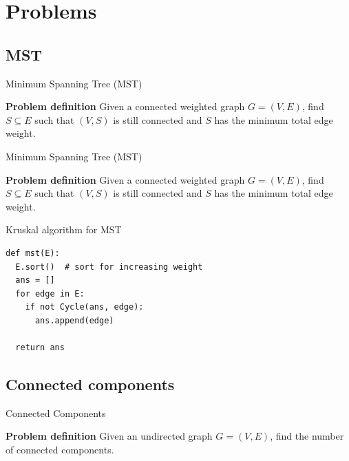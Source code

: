 \documentclass[compress]{beamer}
\begin{document}
\section{Problems}

\subsection{MST}
\begin{frame}{Minimum Spanning Tree (MST)}
  \begin{block}{\textbf{Problem definition}}
    Given a connected weighted graph $G = (V, E)$, find $S \subseteq E$ such that $(V, S)$ is still connected and $S$ has the minimum total edge weight.
  \end{block}
  \begin{center}
  
  \end{center}
\end{frame}

\begin{frame}{Minimum Spanning Tree (MST)}
  \begin{block}{\textbf{Problem definition}}
    Given a connected weighted graph $G = (V, E)$, find $S \subseteq E$ such that $(V, S)$ is still connected and $S$ has the minimum total edge weight.
  \end{block}
  \begin{center}
  
  \end{center}
\end{frame}

\begin{frame}[fragile]{Kruskal algorithm for MST}
\begin{lstlisting}
def mst(E):
  E.sort()  # sort for increasing weight
  ans = []
  for edge in E:
    if not Cycle(ans, edge):
      ans.append(edge)

  return ans
\end{lstlisting}
\end{frame}

\subsection{Connected components}
\begin{frame}{Connected Components}
  \begin{block}{\textbf{Problem definition}}
    Given an undirected graph $G = (V, E)$, find the number of connected components.
  \end{block}
  \begin{center}
  
  \end{center}
\end{frame}
\end{document}
